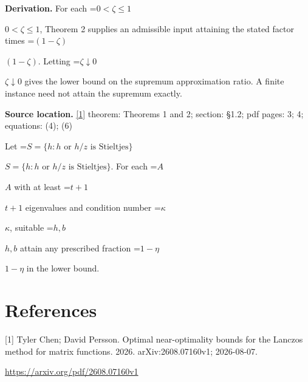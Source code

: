 \documentclass[10pt,a4paper]{article}
\newcommand{\AtlasMath}[1]{\par\begingroup\centering\setbox0=\hbox{$\displaystyle #1$}\ifdim\wd0>1.4\linewidth\typeout{ATLAS WIDE FORMULA: \the\wd0}\fi\ifdim\wd0>\linewidth\resizebox{\linewidth}{!}{\box0}\else\box0\fi\par\endgroup}
\newcommand{\AtlasInlineMath}[1]{\begingroup\setbox0=\hbox{$#1$}\ifdim\wd0>.4\linewidth\endgroup\AtlasMath{#1}\else\endgroup$#1$\fi}
\begin{document}
\textbf{Derivation.} For each \AtlasInlineMath{0<\zeta\le1}, Theorem 2 supplies an admissible input attaining the stated factor times \AtlasInlineMath{(1-\zeta)}. Letting \AtlasInlineMath{\zeta\downarrow0} gives the lower bound on the supremum approximation ratio. A finite instance need not attain the supremum exactly.

\textbf{Source location.} \href{https://arxiv.org/pdf/2608.07160v1}{[1]} theorem: Theorems 1 and 2; section: §1.2; pdf pages: 3; 4; equations: (4); (6)

Let \AtlasInlineMath{S=\{h:h\text{ or }h/z\text{ is Stieltjes}\}}. For each \AtlasInlineMath{A} with at least \AtlasInlineMath{t+1} eigenvalues and condition number \AtlasInlineMath{\kappa}, suitable \AtlasInlineMath{h,b} attain any prescribed fraction \AtlasInlineMath{1-\eta} in the lower bound.

\section{References}
[1] Tyler Chen; David Persson. Optimal near-optimality bounds for the Lanczos method for matrix functions. 2026. arXiv:2608.07160v1; 2026-08-07.

\url{https://arxiv.org/pdf/2608.07160v1}
\end{document}
